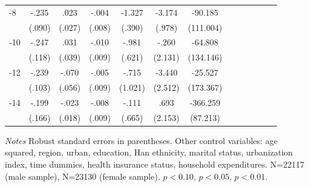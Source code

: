 \begin{table}[p]
\begin{adjustbox}{max width=\linewidth}
\begin{threeparttable}
{\begin{tabular}{l*{6}{SS}}
-8             &    -.235\sym{***}&     .023         &    -.004         &   -1.327\sym{***}&   -3.174\sym{***}&  -90.185         \\
                &   (.090)         &   (.027)         &   (.008)         &   (.390)         &   (.978)         &(111.004)         \\
-10            &    -.247\sym{**} &     .031         &    -.010         &    -.981         &    -.260         &  -64.808         \\
                &   (.118)         &   (.039)         &   (.009)         &   (.621)         &  (2.131)         &(134.146)         \\
-12           &    -.239\sym{**} &    -.070         &    -.005         &    -.715         &   -3.440         &  -25.527         \\
                &   (.103)         &   (.056)         &   (.009)         &  (1.021)         &  (2.512)         &(173.367)         \\
-14           &    -.199         &    -.023         &    -.008         &    -.111         &     .693         & -366.259\sym{***}\\
                &   (.166)         &   (.018)         &   (.009)         &   (.665)         &  (2.153)         & (87.213)         \\      
\bottomrule
\end{tabular}
\begin{tablenotes}
\item \textit{Notes}   Robust standard errors in parentheses.
Other control variables: age squared, region, urban, education, Han ethnicity, marital status, urbanization index, time dummies, health insurance status, household expenditures. N=22117 (male sample), N=23130 (female sample). \sym{*} \(p<0.10\), \sym{**} \(p<0.05\), \sym{***} \(p<0.01\).
\end{tablenotes}
}
\end{threeparttable}
\end{adjustbox}
\end{table}


